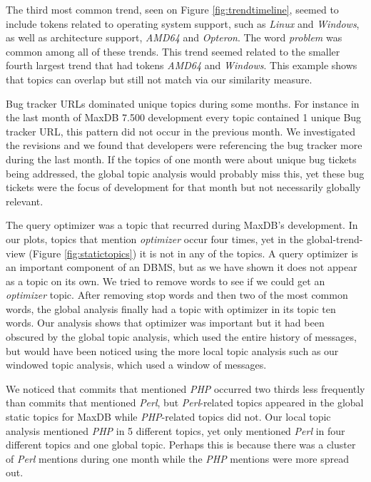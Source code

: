 \documentclass[times, 10pt,twocolumn]{article}
\begin{document}
The third most common trend, seen on Figure \ref{fig:trendtimeline},
seemed to include tokens related to operating system support, such as
\emph{Linux} and \emph{Windows}, as well as architecture support, \emph{AMD64} and
\emph{Opteron}. The word \emph{problem} was common among all of these
trends. This trend seemed related to the smaller fourth largest trend
that had tokens \emph{AMD64} and \emph{Windows}. This example shows that
topics can overlap but still not match via our similarity measure.


Bug tracker URLs dominated unique topics during some months. For
instance in the last month of MaxDB 7.500 development every topic
contained 1 unique Bug tracker URL, this pattern did not occur in the
previous month. We investigated the revisions and we found that
developers were referencing the bug tracker more during the last
month.  If the topics of one month were about unique bug tickets being
addressed, the global topic analysis would probably miss this, yet
these bug tickets were the focus of development for that month but not
necessarily globally relevant.

The query optimizer was a topic that recurred during MaxDB's
development. In our plots, topics that mention \emph{optimizer} occur
four times, yet in the global-trend-view (Figure
\ref{fig:statictopics}) it is not in any of the topics. A query
optimizer is an important component of an DBMS, but as we have shown
it does not appear as a topic on its own. We tried to remove words to
see if we could get an \emph{optimizer} topic. After removing stop
words and then two of the most common words, the global analysis
finally had a topic with optimizer in its topic ten words. Our
analysis shows that optimizer was important but it had been obscured
by the global topic analysis, which used the entire history of
messages, but would have been noticed using the more local topic
analysis such as our windowed topic analysis, which used a window of
messages.

We noticed that commits that mentioned \emph{PHP} occurred two thirds
less frequently than commits that mentioned \emph{Perl}, but
\emph{Perl}-related topics appeared in the global static topics for
MaxDB while \emph{PHP}-related topics did not.  Our local topic
analysis mentioned \emph{PHP} in 5 different topics, yet only
mentioned \emph{Perl} in four different topics and one global
topic. Perhaps this is because there was a cluster of \emph{Perl}
mentions during one month while the \emph{PHP} mentions were more
spread out.
\end{document}
